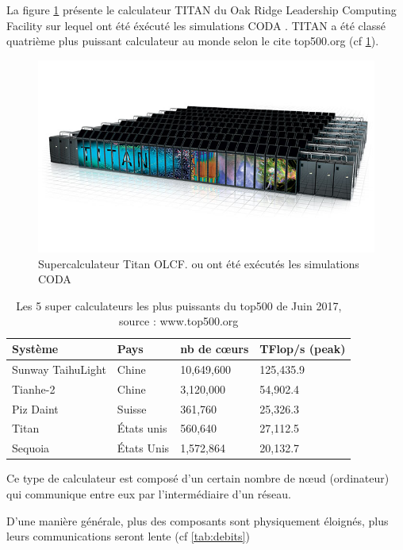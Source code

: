 La figure \ref{fig:titan} présente le calculateur TITAN du Oak Ridge Leadership Computing Facility sur lequel ont été éxécuté les simulations CODA \citep{ocvirk_cosmic_2015}.
TITAN a été classé quatrième plus puissant calculateur au monde selon le cite top500.org (cf \ref{tab:top500}).

\begin{figure}[bth]
        \includegraphics[width=.95\linewidth]{img/02/titan.jpg} 
        \caption{Supercalculateur Titan OLCF.
        ou ont été exécutés les simulations CODA}
 		\label{fig:titan}
\end{figure}

\begin{table}[bth]
\begin{tabular}{ l l l l }
\hline 
Système & Pays & nb de cœurs & TFlop/s (peak) \\
\hline 
Sunway TaihuLight & Chine & 10,649,600 & 125,435.9 \\ 
Tianhe-2  & Chine & 3,120,000 & 54,902.4 \\ 
Piz Daint  & Suisse & 361,760 & 25,326.3 \\ 
Titan  & États unis & 560,640 & 27,112.5 \\ 
Sequoia  & États Unis &1,572,864 & 20,132.7 \\ 
\end{tabular} 
\caption{Les 5 super calculateurs les plus puissants du top500 de Juin 2017, source : www.top500.org}
\label{tab:top500}
\end{table}


Ce type de calculateur est composé d'un certain nombre de nœud (ordinateur) qui communique entre eux par l'intermédiaire d'un réseau.

D'une manière générale, plus des composants sont physiquement éloignés, plus leurs communications seront lente (cf \ref{tab:debits})



